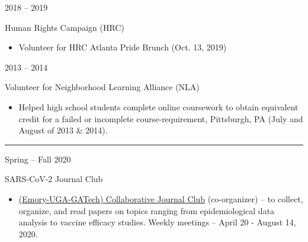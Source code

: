 \documentclass[a4paper,10pt]{article}
\newlength{\cvcolumngapwidth}
\newlength{\cvleftcolumnwidth}
\newlength{\cvrightcolumnwidth}
\newcommand{\cvsectionstyle}[1]{{\normalsize\cvsectionfont\textcolor{cvsectioncolor}{#1}}}
\newcommand{\cvtitlestyle}[1]{{\large\cvtitlefont\textcolor{cvtitlecolor}{#1}}}
\newcommand{\cvheadingstyle}[1]{{\normalsize\cvheadingfont\textcolor{cvheadingcolor}{#1}}}
\newlength{\cvafteritemskipamount}
\newlength{\cvaftersectionskipamount}
\newlength{\cvbetweensectionandheadingextraskipamount}
\newlength{\cvaftertitleskipamount}
\newlength{\cvparskip}
\newcommand{\cvsection}[1]{
            \begin{minipage}[t]{\cvleftcolumnwidth}
                \raggedleft\cvsectionstyle{#1}
            \end{minipage}%
            \hspace{\cvcolumngapwidth}%
            \begin{minipage}[t]{\cvrightcolumnwidth}
                \textcolor{cvrulecolor}{\rule{\cvrightcolumnwidth}{0.3mm}}
            \end{minipage}
        
            \vspace{\cvaftersectionskipamount}
        }
\newcommand{\cvitem}[2]{
            \begin{minipage}[t]{\cvleftcolumnwidth}
                \raggedleft #1
            \end{minipage}%
            \hspace{\cvcolumngapwidth}%
            \begin{minipage}[t]{\cvrightcolumnwidth}
                \setlength{\parskip}{\cvparskip} #2
            \end{minipage}
        
            \vspace{\cvafteritemskipamount}
        }
\newcommand{\cvtitle}[1]{
            \cvtitlestyle{#1}
        
            \vspace{\cvaftertitleskipamount}
            \vspace{-\cvparskip}
        }
\begin{document}
        
        \cvitem{
            \cvheadingstyle{2018 -- 2019}
        }{
            \cvtitle{Human Rights Campaign (HRC)}
        
            \begin{itemize}[leftmargin=*]
            	\item Volunteer for HRC Atlanta Pride Brunch (Oct. 13, 2019)
        
            \end{itemize}
        
        }
        
          \cvitem{
            \cvheadingstyle{2013 -- 2014}
        }{
            \cvtitle{Volunteer for Neighborhood Learning Alliance (NLA)}
            \begin{itemize}[leftmargin=*]
               	\item Helped high school students complete online coursework to obtain equivalent
        credit for a failed or incomplete course-requirement, Pittsburgh, PA (July and August of 2013 \& 2014).
            \end{itemize}  
        }
        
        
      
    
        
        \cvsection{GROUPS \& ORGANIZATIONS}
        \vspace{\cvbetweensectionandheadingextraskipamount}
        
        \cvitem{
            \cvheadingstyle{Spring -- Fall 2020}
        }{
            \cvtitle{SARS-CoV-2 Journal Club}
            \begin{itemize}[leftmargin=*]
                	\item \href{https://docs.google.com/document/d/1jMU-Rc--9MpwKwmoHNcR_SD4T0128dSvHaiJtECwO50/edit?usp=sharing}{(Emory-UGA-GATech) Collaborative Journal Club} (co-organizer) --  to collect, organize, and read papers on topics ranging from epidemiological data analysis to vaccine efficacy studies. Weekly meetings -- April 20 - August 14, 2020.
            \end{itemize}
        }
        
\end{document}
